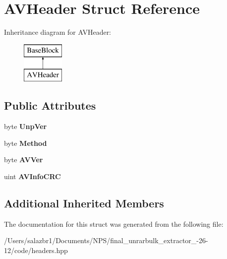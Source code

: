 \hypertarget{struct_a_v_header}{\section{A\-V\-Header Struct Reference}
\label{struct_a_v_header}
}
Inheritance diagram for A\-V\-Header\-:\begin{figure}[H]
\begin{center}
\leavevmode
\includegraphics[height=2.000000cm]{struct_a_v_header}
\end{center}
\end{figure}
\subsection*{Public Attributes}
\begin{DoxyCompactItemize}
\item 
\hypertarget{struct_a_v_header_aa8b96dc3302838d9f5ece7bdb5a474b0}{byte {\bfseries Unp\-Ver}}\label{struct_a_v_header_aa8b96dc3302838d9f5ece7bdb5a474b0}

\item 
\hypertarget{struct_a_v_header_a3f28e3850c904233913f909622939dfc}{byte {\bfseries Method}}\label{struct_a_v_header_a3f28e3850c904233913f909622939dfc}

\item 
\hypertarget{struct_a_v_header_a6d3f15088c1aec8742727529edb27041}{byte {\bfseries A\-V\-Ver}}\label{struct_a_v_header_a6d3f15088c1aec8742727529edb27041}

\item 
\hypertarget{struct_a_v_header_a0e4d520a6f97df32b41b5b6c364aa498}{uint {\bfseries A\-V\-Info\-C\-R\-C}}\label{struct_a_v_header_a0e4d520a6f97df32b41b5b6c364aa498}

\end{DoxyCompactItemize}
\subsection*{Additional Inherited Members}


The documentation for this struct was generated from the following file\-:\begin{DoxyCompactItemize}
\item 
/\-Users/salazbr1/\-Documents/\-N\-P\-S/final\-\_\-unrarbulk\-\_\-extractor\-\_-\/26-\/12/code/headers.\-hpp\end{DoxyCompactItemize}
